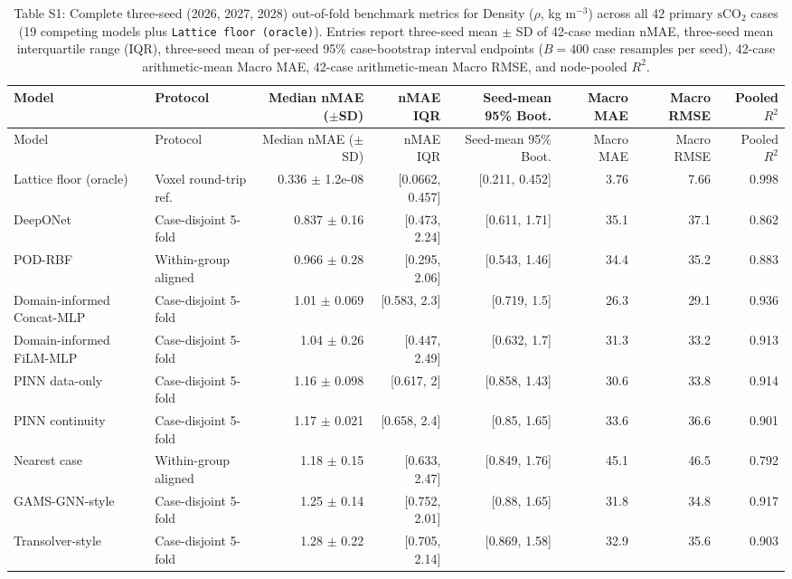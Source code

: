 \begin{landscape}\scriptsize
\begin{longtable}{p{3.8cm}p{2.9cm}rrrrrr}
\caption{Table S1: Complete three-seed (2026, 2027, 2028) out-of-fold benchmark metrics for Density ($\rho$, kg m$^{-3}$) across all 42 primary $\mathrm{sCO}_2$ cases (19 competing models plus \texttt{Lattice floor (oracle)}). Entries report three-seed mean $\pm$ SD of 42-case median nMAE, three-seed mean interquartile range (IQR), three-seed mean of per-seed 95\% case-bootstrap interval endpoints ($B=400$ case resamples per seed), 42-case arithmetic-mean Macro MAE, 42-case arithmetic-mean Macro RMSE, and node-pooled $R^2$.}\\
\toprule Model & Protocol & Median nMAE ($\pm$SD) & nMAE IQR & Seed-mean 95\% Boot. & Macro MAE & Macro RMSE & Pooled $R^2$\\
\midrule\endfirsthead
\toprule Model & Protocol & Median nMAE ($\pm$SD) & nMAE IQR & Seed-mean 95\% Boot. & Macro MAE & Macro RMSE & Pooled $R^2$\\
\midrule\endhead
Lattice floor (oracle) & Voxel round-trip ref. & 0.336 $\pm$ 1.2e-08 & [0.0662, 0.457] & [0.211, 0.452] & 3.76 & 7.66 & 0.998 \\
DeepONet & Case-disjoint 5-fold & 0.837 $\pm$ 0.16 & [0.473, 2.24] & [0.611, 1.71] & 35.1 & 37.1 & 0.862 \\
POD-RBF & Within-group aligned & 0.966 $\pm$ 0.28 & [0.295, 2.06] & [0.543, 1.46] & 34.4 & 35.2 & 0.883 \\
Domain-informed Concat-MLP & Case-disjoint 5-fold & 1.01 $\pm$ 0.069 & [0.583, 2.3] & [0.719, 1.5] & 26.3 & 29.1 & 0.936 \\
Domain-informed FiLM-MLP & Case-disjoint 5-fold & 1.04 $\pm$ 0.26 & [0.447, 2.49] & [0.632, 1.7] & 31.3 & 33.2 & 0.913 \\
PINN data-only & Case-disjoint 5-fold & 1.16 $\pm$ 0.098 & [0.617, 2] & [0.858, 1.43] & 30.6 & 33.8 & 0.914 \\
PINN continuity & Case-disjoint 5-fold & 1.17 $\pm$ 0.021 & [0.658, 2.4] & [0.85, 1.65] & 33.6 & 36.6 & 0.901 \\
Nearest case & Within-group aligned & 1.18 $\pm$ 0.15 & [0.633, 2.47] & [0.849, 1.76] & 45.1 & 46.5 & 0.792 \\
GAMS-GNN-style & Case-disjoint 5-fold & 1.25 $\pm$ 0.14 & [0.752, 2.01] & [0.88, 1.65] & 31.8 & 34.8 & 0.917 \\
Transolver-style & Case-disjoint 5-fold & 1.28 $\pm$ 0.22 & [0.705, 2.14] & [0.869, 1.58] & 32.9 & 35.6 & 0.903 \\

\end{longtable}
\end{landscape}
